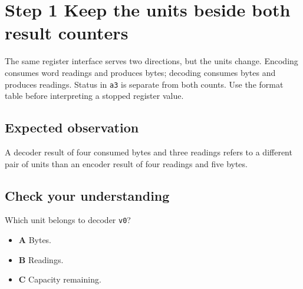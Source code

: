 \section{Step 1 Keep the units beside both result counters}\label{delta-s01}

The same register interface serves two directions, but the units change. Encoding consumes word readings and produces bytes; decoding consumes bytes and produces readings. Status in \texttt{a3} is separate from both counts. Use the format table before interpreting a stopped register value.

\subsection{Expected observation}
A decoder result of four consumed bytes and three readings refers to a different pair of units than an encoder result of four readings and five bytes.

\subsection{Check your understanding}
Which unit belongs to decoder \texttt{v0}?

\begin{itemize}
\item \textbf{A} Bytes.
\item \textbf{B} Readings.
\item \textbf{C} Capacity remaining.
\end{itemize}
